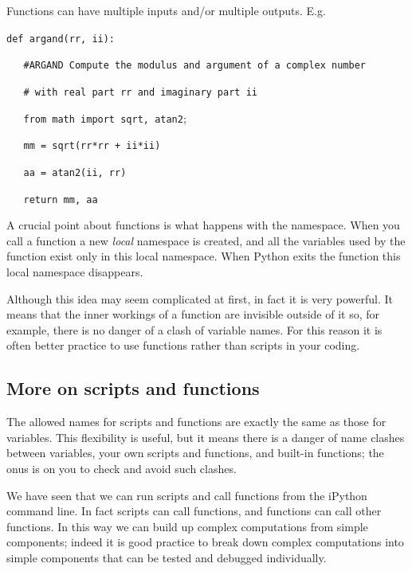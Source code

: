 
Functions can have multiple inputs and/or multiple outputs. E.g.

\vspace{3mm}

\noindent
\texttt{def argand(rr, ii):}

\noindent
\texttt{\ \ \ \#ARGAND Compute the modulus and argument of a complex number}

\noindent
\texttt{\ \ \ \# with real part rr and imaginary part ii}

\noindent
\texttt{\ \ \ from math import sqrt, atan2};

\noindent
\texttt{\ \ \ mm = sqrt(rr*rr + ii*ii)}

\noindent
\texttt{\ \ \ aa = atan2(ii, rr)}

\noindent
\texttt{\ \ \ return mm, aa}


\vspace{3mm}

A crucial point about functions is what happens with the
namespace. When you call a function a new \textit{local} namespace is
created, and all the variables used by the function exist only in this
local namespace. When Python exits the function this local namespace
disappears.

Although this idea may seem complicated at first, in fact it is very powerful.
It means that the inner workings of a function are invisible outside of it
so, for example, there is no danger of a clash of variable names. For this reason
it is often better practice to use functions rather than scripts in your coding.


\subsection{More on scripts and functions}

The allowed names for scripts and functions are exactly the same as those
for variables. This flexibility is useful, but it means there is a danger
of name clashes between variables, your own scripts and functions,
and built-in functions; the onus is on you to check and avoid such clashes.

We have seen that we can run scripts and call functions from the
iPython command line.  In fact scripts can call functions, and
functions can call other functions. In this way we can build up
complex computations from simple components; indeed it is good
practice to break down complex computations into simple components
that can be tested and debugged individually.


